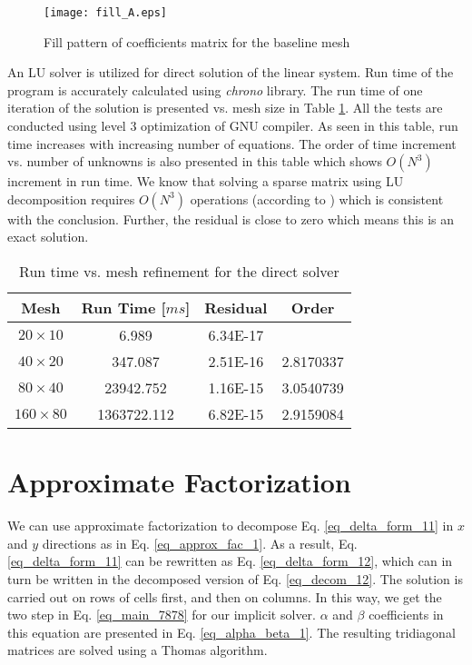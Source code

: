 \documentclass{article}
\begin{document}
\begin{figure}[H]
\centering
\texttt{[image: fill\_A.eps]}
\caption{Fill pattern of coefficients matrix for the baseline mesh}
\label{fig_fill_A_1}
\end{figure}

An LU solver is utilized for direct solution of the linear system. Run time of the program is accurately calculated using \emph{chrono} library. The run time of one iteration of the solution is presented vs. mesh size in Table \ref{table_direct_1}. All the tests are conducted using level 3 optimization of GNU compiler. As seen in this table, run time increases with increasing number of equations. The order of time increment vs. number of unknowns is also presented in this table which shows $O(N^3)$ increment in run time. We know that solving a sparse matrix using LU decomposition requires $O(N^3)$ operations (according to \cite{press2002numerical}) which is consistent with the conclusion. Further, the residual is close to zero which means this is an exact solution.

\begin{table}[H]
\centering
\caption{Run time vs. mesh refinement for the direct solver}
\label{table_direct_1}
\begin{tabular}{cccc}
\hline
Mesh & Run Time [$m s$] & Residual & Order\\
\hline\hline
$20 \times 10$  & 6.989       & 6.34E-17 &           \\
$40 \times 20$  & 347.087     & 2.51E-16 & 2.8170337 \\
$80 \times 40$  & 23942.752   & 1.16E-15 & 3.0540739 \\
$160 \times 80$ & 1363722.112 & 6.82E-15 & 2.9159084 \\
\hline
\end{tabular}
\end{table}




\section{Approximate Factorization}
We can use approximate factorization to decompose Eq. \ref{eq_delta_form_11} in $x$ and $y$ directions as in Eq. \ref{eq_approx_fac_1}. As a result, Eq. \ref{eq_delta_form_11} can be rewritten as Eq. \ref{eq_delta_form_12}, which can in turn be written in the decomposed version of Eq. \ref{eq_decom_12}. The solution is carried out on rows of cells first, and then on columns. In this way, we get the two step in Eq. \ref{eq_main_7878} for our implicit solver. $\alpha$ and $\beta$ coefficients in this equation are presented in Eq. \ref{eq_alpha_beta_1}. The resulting tridiagonal matrices are solved using a Thomas algorithm.
\end{document}
